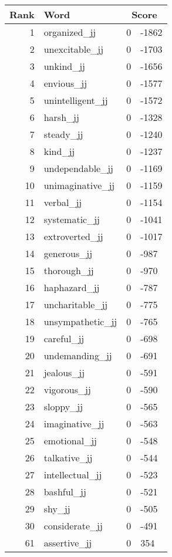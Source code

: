 \begin{longtable}[!htbp]{| rlr@{.}l |}
    \hline
    \textbf{Rank} & \textbf{Word} & \multicolumn{2}{c|}{\textbf{Score}} \\
    \hline
    \endhead
    1 & organized\_jj & 0 & -1862 \\
    2 & unexcitable\_jj & 0 & -1703 \\
    3 & unkind\_jj & 0 & -1656 \\
    4 & envious\_jj & 0 & -1577 \\
    5 & unintelligent\_jj & 0 & -1572 \\
    6 & harsh\_jj & 0 & -1328 \\
    7 & steady\_jj & 0 & -1240 \\
    8 & kind\_jj & 0 & -1237 \\
    9 & undependable\_jj & 0 & -1169 \\
    10 & unimaginative\_jj & 0 & -1159 \\
    11 & verbal\_jj & 0 & -1154 \\
    12 & systematic\_jj & 0 & -1041 \\
    13 & extroverted\_jj & 0 & -1017 \\
    14 & generous\_jj & 0 & -987 \\
    15 & thorough\_jj & 0 & -970 \\
    16 & haphazard\_jj & 0 & -787 \\
    17 & uncharitable\_jj & 0 & -775 \\
    18 & unsympathetic\_jj & 0 & -765 \\
    19 & careful\_jj & 0 & -698 \\
    20 & undemanding\_jj & 0 & -691 \\
    21 & jealous\_jj & 0 & -591 \\
    22 & vigorous\_jj & 0 & -590 \\
    23 & sloppy\_jj & 0 & -565 \\
    24 & imaginative\_jj & 0 & -563 \\
    25 & emotional\_jj & 0 & -548 \\
    26 & talkative\_jj & 0 & -544 \\
    27 & intellectual\_jj & 0 & -523 \\
    28 & bashful\_jj & 0 & -521 \\
    29 & shy\_jj & 0 & -505 \\
    30 & considerate\_jj & 0 & -491 \\
    61 & assertive\_jj & 0 & 354 \\

\end{longtable}
